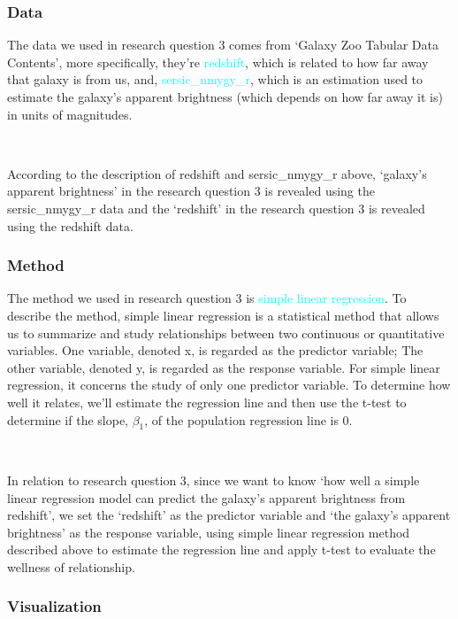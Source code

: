 \documentclass[12pt]{article}
\begin{document}
\subsubsection{Data}

The data we used in research question 3 comes from `Galaxy Zoo Tabular Data Contents', more specifically, they're \textcolor{cyan}{redshift}, which is related to how far away that galaxy is from us, and, \textcolor{cyan}{sersic\_nmygy\_r}, which is an estimation used to estimate the galaxy's apparent brightness (which depends on how far away it is) in units of magnitudes.

\

\noindent According to the description of redshift and sersic\_nmygy\_r above, `galaxy's apparent brightness' in the research question 3 is revealed using the sersic\_nmygy\_r data and the `redshift' in the research question 3 is revealed using the redshift data.

\subsubsection{Method}

The method we used in research question 3 is \textcolor{cyan}{simple linear regression}. To describe the method, simple linear regression is a statistical method that allows us to summarize and study relationships between two continuous or quantitative variables. One variable, denoted x, is regarded as the predictor variable; The other variable, denoted y, is regarded as the response variable. For simple linear regression, it concerns the study of only one predictor variable. To determine how well it relates, we'll estimate the regression line and then use the t-test to determine if the slope, $\beta_1$, of the population regression line is 0.

\

\noindent In relation to research question 3, since we want to know `how well a simple linear regression model can predict the galaxy's apparent brightness from redshift', we set the `redshift' as the predictor variable and `the galaxy's apparent brightness' as the response variable, using simple linear regression method described above to estimate the regression line and apply t-test to evaluate the wellness of relationship. 

\subsubsection{Visualization}
\end{document}

